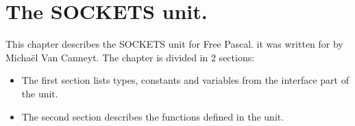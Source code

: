 %
%
%
%
%
\chapter{The SOCKETS unit.}
This chapter describes the SOCKETS unit for Free Pascal. 
it was written for \linux by Micha\"el Van Canneyt. 
The chapter is divided in 2 sections:
\begin{itemize}
\item The first section lists types, constants and variables from the
interface part of the unit.
\item The second section describes the functions defined in the unit.
\end{itemize}
